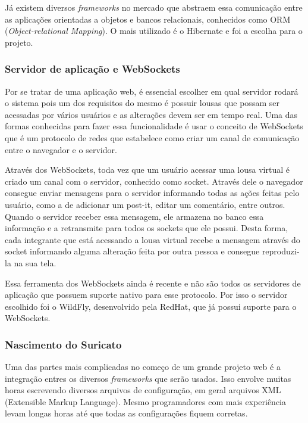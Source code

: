 Já existem diversos \textit{frameworks} no mercado que abstraem essa comunicação entre as aplicações orientadas a objetos e bancos relacionais, conhecidos como ORM (\textit{Object-relational Mapping}). O mais utilizado é o Hibernate e foi a escolha para o projeto.

\subsubsection*{Servidor de aplicação e WebSockets}

Por se tratar de uma aplicação web, é essencial escolher em qual servidor rodará o sistema pois um dos requisitos do mesmo é possuir lousas que possam ser acessadas por vários usuários e as alterações devem ser em tempo real. Uma das formas conhecidas para fazer essa funcionalidade é usar o conceito de WebSockets que é um protocolo de redes que estabelece como criar um canal de comunicação entre o navegador e o servidor.

Através dos WebSockets, toda vez que um usuário acessar uma lousa virtual é criado um canal com o servidor, conhecido como socket. Através dele o navegador consegue enviar mensagens para o servidor informando todas as ações feitas pelo usuário, como a de adicionar um post-it, editar um comentário, entre outros. Quando o servidor receber essa mensagem, ele armazena no banco essa informação e a retransmite para todos os sockets que ele possui. Desta forma, cada integrante que está acessando a lousa virtual recebe a mensagem através do socket informando alguma alteração feita por outra pessoa e consegue reproduzi-la na sua tela.

Essa ferramenta dos WebSockets ainda é recente e não são todos os servidores de aplicação que possuem suporte nativo para esse protocolo. Por isso o servidor escolhido foi o WildFly, desenvolvido pela RedHat, que já possui suporte para o WebSockets.

\subsubsection*{Nascimento do Suricato}

Uma das partes mais complicadas no começo de um grande projeto web é a integração entres os diversos \textit{frameworks} que serão usados. Isso envolve muitas horas escrevendo diversos arquivos de configuração, em geral arquivos XML (Extensible Markup Language). Mesmo programadores com mais experiência levam longas horas até que todas as configurações fiquem corretas. 
	
